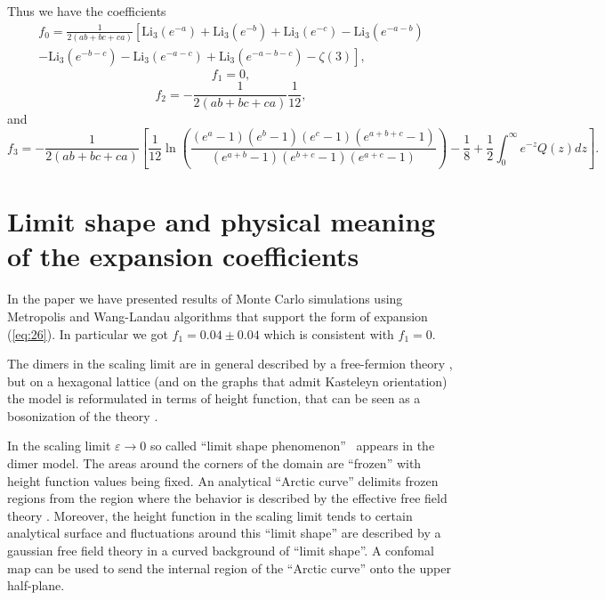 \documentclass{article}
\newcommand{\Li}{\mathrm{Li}}
\begin{document}
Thus we have the coefficients
\begin{multline}
  \label{eq:27}
  f_{0}=\frac{1}{2(ab+bc+ca)}\left[\Li_{3}(e^{-a})+\Li_{3}(e^{-b})+\Li_{3}(e^{-c})-
    \Li_{3}(e^{-a-b})\right.\\
  \left.-\Li_{3}(e^{-b-c})-    \Li_{3}(e^{-a-c})+    \Li_{3}(e^{-a-b-c})-\zeta(3)\right],
\end{multline}
\begin{equation}
  \label{eq:28}
  f_{1}=0,
\end{equation}
\begin{equation}
  \label{eq:30}
  f_{2}=-\frac{1}{2(ab+bc+ca)}\frac{1}{12},
\end{equation}
and
\begin{equation}
  \label{eq:29}
  f_{3}=-\frac{1}{2(ab+bc+ca)}\left[\frac{1}{12}\ln\left(\frac{(e^{a}-1)(e^{b}-1)(e^{c}-1)(e^{a+b+c}-1)}{(e^{a+b}-1)(e^{b+c}-1)(e^{a+c}-1)}\right)-\frac{1}{8}+ \frac{1}{2}\int_{0}^{\infty} e^{-z}Q(z) dz
    \right].
\end{equation}



\section{Limit shape and physical meaning of the expansion coefficients}
\label{sec:accur-expans-phys}

In the paper \cite{1742-6596-1135-1-012024} we have presented results of Monte Carlo simulations using
Metropolis and Wang-Landau algorithms that support the form of expansion (\ref{eq:26}). In
particular we got $f_{1}=0.04\pm 0.04$ which is consistent with $f_{1}=0$. 

The dimers in the scaling limit are in general described by a
free-fermion theory \cite{dijkgraaf2009dimer}, but on a hexagonal
lattice (and on the graphs that admit Kasteleyn orientation) the model
is reformulated in terms of height function, that can be seen as a
bosonization of the theory \cite{gogolin2004bosonization}.

In the scaling limit $\varepsilon\to 0$ so called ``limit shape
phenomenon''~\cite{1998math......1068J,cohn1998shape} appears in the
dimer model. The areas around the corners of the domain are ``frozen''
with height function values being fixed. An analytical ``Arctic
curve'' delimits frozen regions from the region where the behavior is
described by the effective free field theory
\cite{kenyon2009lectures,kenyon2008height,kenyon2006dimers}. Moreover,
the height function in the scaling limit tends to certain analytical
surface and fluctuations around this ``limit shape'' are described by
a gaussian free field theory in a curved background of ``limit
shape''. A confomal map can be used to send the internal region of the
``Arctic curve'' onto the upper half-plane.
\end{document}
